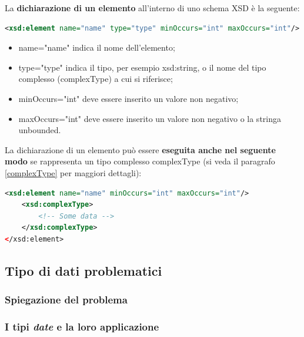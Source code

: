 \documentclass[a4paper]{article}
\begin{document}
	\noindent
	La \textbf{dichiarazione di un elemento} all'interno di uno schema XSD è la seguente:
	\begin{lstlisting}[language=XML]
<xsd:element name="name" type="type" minOccurs="int" maxOccurs="int"/>\end{lstlisting}
	\begin{itemize}
		\item \textsf{name="name"} indica il nome dell'elemento;
		
		\item \textsf{type="type"} indica il tipo, per esempio \textsf{xsd:string}, o il nome del tipo complesso (\textsf{complexType}) a cui si riferisce;
		
		\item \textsf{minOccurs="int"} deve essere inserito un valore non negativo;
		
		\item \textsf{maxOccurs="int"} deve essere inserito un valore non negativo o la stringa \textsf{unbounded}.
	\end{itemize}
	La dichiarazione di un elemento può essere \textbf{eseguita anche nel seguente modo} se rappresenta un tipo complesso \textsf{complexType} (si veda il paragrafo \ref{complexType} per maggiori dettagli):
	\begin{lstlisting}[language=XML]
<xsd:element name="name" minOccurs="int" maxOccurs="int"/>
	<xsd:complexType>
		<!-- Some data -->
	</xsd:complexType>
</xsd:element>\end{lstlisting}\newpage
	
	\subsection{Tipo di dati problematici}
	
	\subsubsection{Spiegazione del problema}
	
	\subsubsection{I tipi \emph{date} e la loro applicazione}
	
\end{document}
